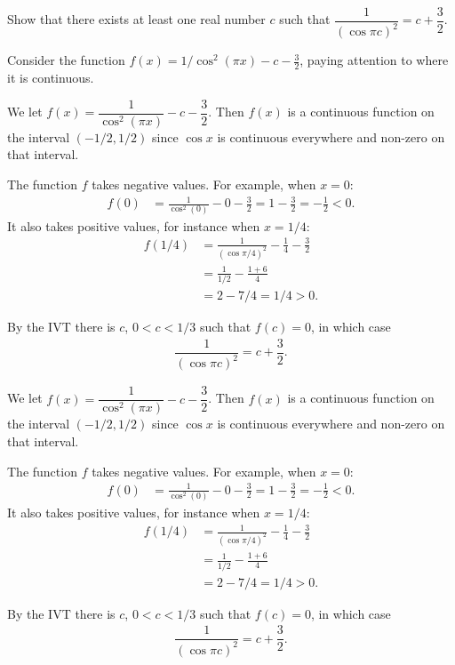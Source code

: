 \begin{question}[2015Q]
Show that there exists at least one real number $c$ such that
$\dfrac{1}{(\cos\pi c)^2} = c+\dfrac{3}{2}$.
\end{question}
\begin{hint}
Consider the function $f(x)=1/\cos^2(\pi x)-c-\frac{3}{2}$, paying attention to where it is continuous.
\end{hint}
\begin{answer}
We let $f(x)=\dfrac{1}{\cos^2(\pi x)}-c-\dfrac{3}{2}$. Then $f(x)$ is a continuous function on the
interval $(-1/2, 1/2)$ since $\cos x$ is continuous everywhere and non-zero on that
interval.

The function $f$ takes negative values.  For example, when $x=0$:
\begin{align*}
f(0) &= \frac{1}{\cos^2(0)} - 0 - \frac{3}{2} = 1-\frac{3}{2} = -\frac{1}{2} <0.
\end{align*}
It also takes positive values, for instance when $x=1/4$:
\begin{align*}
f(1/4) &= \frac{1}{(\cos \pi/4)^2} - \frac{1}{4} - \frac{3}{2} \\
  &= \frac{1}{1/2} - \frac{1+6}{4} \\
  &= 2 - 7/4 = 1/4 >0.
\end{align*}

By the IVT there is $c$, $0<c<1/3$ such that $f(c)=0$, in which case
\begin{align*}
\dfrac{1}{(\cos\pi c)^2} = c+\dfrac{3}{2}.
\end{align*}
\end{answer}
\begin{solution}
We let $f(x)=\dfrac{1}{\cos^2(\pi x)}-c-\dfrac{3}{2}$. Then $f(x)$ is a continuous function on the
interval $(-1/2, 1/2)$ since $\cos x$ is continuous everywhere and non-zero on that
interval.

The function $f$ takes negative values.  For example, when $x=0$:
\begin{align*}
f(0) &= \frac{1}{\cos^2(0)} - 0 - \frac{3}{2} = 1-\frac{3}{2} = -\frac{1}{2} <0.
\end{align*}
It also takes positive values, for instance when $x=1/4$:
\begin{align*}
f(1/4) &= \frac{1}{(\cos \pi/4)^2} - \frac{1}{4} - \frac{3}{2} \\
  &= \frac{1}{1/2} - \frac{1+6}{4} \\
  &= 2 - 7/4 = 1/4 >0.
\end{align*}

By the IVT there is $c$, $0<c<1/3$ such that $f(c)=0$, in which case
\begin{align*}
\dfrac{1}{(\cos\pi c)^2} = c+\dfrac{3}{2}.
\end{align*}
\end{solution}







